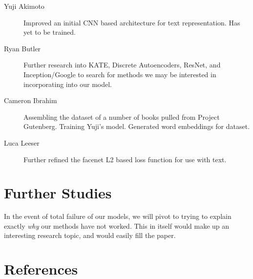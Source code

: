 \documentclass{article}
\begin{document}
\begin{description}

	\item [Yuji Akimoto]
		Improved an initial CNN based architecture for text representation. Has yet to be trained. 

	\item [Ryan Butler]
		Further research into KATE, Discrete Autoencoders, ResNet, and Inception/Google to search
		for methods we may be interested in incorporating into our model.

	\item [Cameron Ibrahim]
		Assembling the dataset of a number of books pulled from Project Gutenberg. Training Yuji's model. Generated word embeddings for dataset.

	\item [Luca Leeser]
		Further refined the facenet L2 based loss function for use with text.

\end{description}

\section{Further Studies}

In the event of total failure of our models, we will pivot to trying to explain exactly \emph{why} our methods have not worked. This in itself would make up an interesting research topic, and would easily fill the paper.
\section{References}
\end{document}
